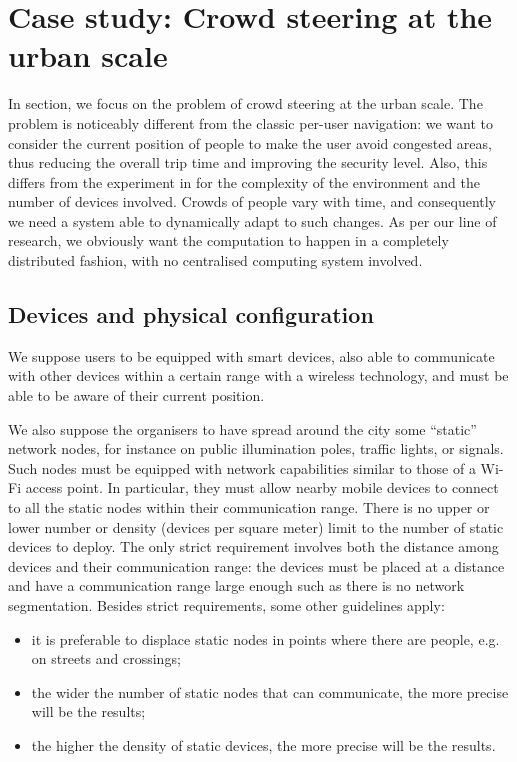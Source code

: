 \documentclass[12pt,a4paper,twoside,openright]{book}
\begin{document}
\chapter{Case study: Crowd steering at the urban scale}
\label{ahpc-steering}
In section, we focus on the problem of crowd steering at the urban scale.
%
The problem is noticeably different from the classic per-user navigation: we want to consider the current position of people to make the user avoid congested areas, thus reducing the overall trip time and improving the security level.
%
Also, this differs from the experiment in  for the complexity of the environment and the number of devices involved.
%
Crowds of people vary with time, and consequently we need a system able to dynamically adapt to such changes.
%
As per our line of research, we obviously want the computation to happen in a completely distributed fashion, with no centralised computing system involved.

\section{Devices and physical configuration}

We suppose users to be equipped with smart devices, also able to communicate with other devices within a certain range with a wireless technology, and must be able to be aware of their current position.

We also suppose the organisers to have spread around the city some ``static'' network nodes, for instance on public illumination poles, traffic lights, or signals.
%
Such nodes must be equipped with network capabilities similar to those of a Wi-Fi access point.
%
In particular, they must allow nearby mobile devices to connect to all the static nodes within their communication range.
%
There is no upper or lower number or density (devices per square meter) limit to the number of static devices to deploy.
%
The only strict requirement involves both the distance among devices and their communication range: the devices must be placed at a distance and have a communication range large enough such as there is no network segmentation.
%
Besides strict requirements, some other guidelines apply:
\begin{itemize}
 \item it is preferable to displace static nodes in points where there are people, e.g. on streets and crossings;
 \item the wider the number of static nodes that can communicate, the more precise will be the results;
 \item the higher the density of static devices, the more precise will be the results.
\end{itemize}
\end{document}
